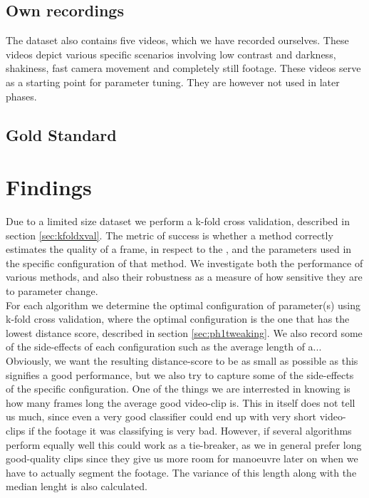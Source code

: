 \subsection{Own recordings}
%
The dataset also contains five videos, which we have recorded ourselves. These videos depict various specific scenarios involving low contrast and darkness, shakiness, fast camera movement and completely still footage. These videos serve as a starting point for parameter tuning. They are however not used in later phases.
%
%
\subsection{Gold Standard}\label{sec:goldstandard}
%
\section{Findings}
%
Due to a limited size dataset we perform a k-fold cross validation, described in section \ref{sec:kfoldxval}. The metric of success is whether a method correctly estimates the quality of a frame, in respect to the , and the parameters used in the specific configuration of that method. We investigate both the performance of various methods, and also their robustness as a measure of how sensitive they are to parameter change.\\
For each algorithm we determine the optimal configuration of parameter(s) using k-fold cross validation, where the optimal configuration is the one that has the lowest distance score, described in section \ref{sec:ph1tweaking}. We also record some of the side-effects of each configuration such as the average length of a...\\
Obviously, we want the resulting distance-score to be as small as possible as this signifies a good performance, but we also try to capture some of the side-effects of the specific configuration. One of the things we are interrested in knowing is how many frames long the average good video-clip is. This in itself does not tell us much, since even a very good classifier could end up with very short video-clips if the footage it was classifying is very bad. However, if several algorithms perform equally well this could work as a tie-breaker, as we in general prefer long good-quality clips since they give us more room for manoeuvre later on when we have to actually segment the footage. The variance of this length along with the median lenght is also calculated.
%
